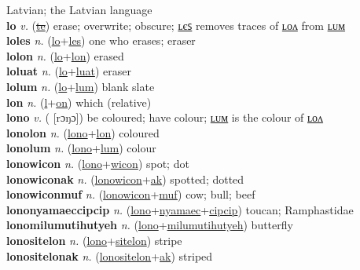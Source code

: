 Latvian; the Latvian language \label{'latwiyatilip} \\
\textbf{lo} \textit{v.} (\hyperref[te]{\sout{te}})
erase; overwrite; obscure; \hyperref[loles]{ʟєꜱ} removes traces of \hyperref[lolon]{ʟᴏᴧ} from \hyperref[lolum]{ʟᴜᴍ} \label{lo} \\
\textbf{loles} \textit{n.} (\hyperref[lo]{lo}+\hyperref[les]{les})
one who erases; eraser \label{loles} \\
\textbf{lolon} \textit{n.} (\hyperref[lo]{lo}+\hyperref[lon]{lon})
erased \label{lolon} \\
\textbf{loluat} \textit{n.} (\hyperref[lo]{lo}+\hyperref[luat]{luat})
eraser \label{loluat} \\
\textbf{lolum} \textit{n.} (\hyperref[lo]{lo}+\hyperref[lum]{lum})
blank slate \label{lolum} \\
\textbf{lon} \textit{n.} (\hyperref[l]{l}+\hyperref[on]{on})
which (relative) \label{lon} \\
\textbf{lono} \textit{v.} ( [rɔŋɔ])
be coloured; have colour; \hyperref[lonolum]{ʟᴜᴍ} is the colour of \hyperref[lonolon]{ʟᴏᴧ} \label{lono} \\
\textbf{lonolon} \textit{n.} (\hyperref[lono]{lono}+\hyperref[lon]{lon})
coloured \label{lonolon} \\
\textbf{lonolum} \textit{n.} (\hyperref[lono]{lono}+\hyperref[lum]{lum})
colour \label{lonolum} \\
\textbf{lonowicon} \textit{n.} (\hyperref[lono]{lono}+\hyperref[wicon]{wicon})
spot; dot \label{lonowicon} \\
\textbf{lonowiconak} \textit{n.} (\hyperref[lonowicon]{lonowicon}+\hyperref[ak]{ak})
spotted; dotted \label{lonowiconak} \\
\textbf{lonowiconmuf} \textit{n.} (\hyperref[lonowicon]{lonowicon}+\hyperref[muf]{muf})
cow; bull; beef \label{lonowiconmuf} \\
\textbf{lononyamaeccipcip} \textit{n.} (\hyperref[lono]{lono}+\hyperref[nyamaec]{nyamaec}+\hyperref[cipcip]{cipcip})
toucan; Ramphastidae \label{lononyamaeccipcip} \\
\textbf{lonomilumutihutyeh} \textit{n.} (\hyperref[lono]{lono}+\hyperref[milumutihutyeh]{milumutihutyeh})
butterfly \label{lonomilumutihutyeh} \\
\textbf{lonositelon} \textit{n.} (\hyperref[lono]{lono}+\hyperref[sitelon]{sitelon})
stripe \label{lonositelon} \\
\textbf{lonositelonak} \textit{n.} (\hyperref[lonositelon]{lonositelon}+\hyperref[ak]{ak})
striped \label{lonositelonak} \\
